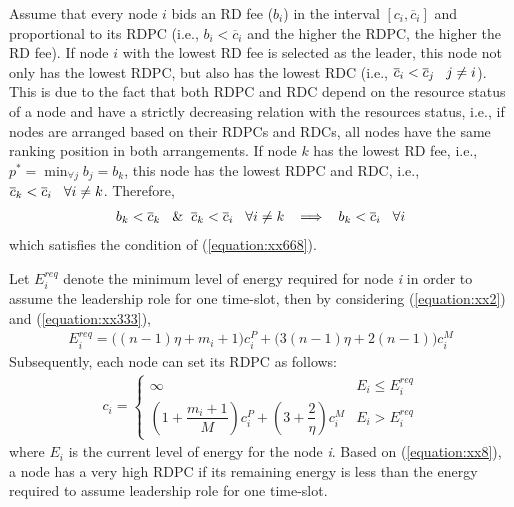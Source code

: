 \documentclass[journal,12pt, onecolumn]{IEEEtran}
\begin{document}
Assume that every node $i$ bids an RD fee ($b_i$) in the interval $[c_i,\overline{c}_i]$ and proportional to its RDPC (i.e., $b_i <\overline{c}_i$ and the higher the RDPC, the higher the RD fee). If node $i$ with the lowest RD fee is selected as the leader, this node not only has the lowest RDPC, but also has the lowest RDC (i.e., $\overline{c}_i<\overline{c}_j \hspace{3mm}  j\neq i$). This is due to the fact that both RDPC and RDC depend on the resource status of a node and have a strictly decreasing relation with the resources status, i.e., if nodes are arranged based on their RDPCs and RDCs, all nodes have the same ranking position in both arrangements. 
If node $k$ has the lowest RD fee, i.e., $p^* = \min_{\forall j} b_j = b_k$, this node has the lowest RDPC and RDC, i.e., $\overline{c}_k <\overline{c}_i \hspace{3mm} \forall i\neq k$. Therefore,
\begin{align}
\label{equation:xx601}
b_k <\overline{c}_k  \hspace{3mm} \&  \hspace{2mm} \overline{c}_k<\overline{c}_i \hspace{3mm} \forall i\neq k \hspace{3mm} \Longrightarrow \hspace{3mm} b_k <\overline{c}_i \hspace{3mm} \forall i
\end{align} 
which satisfies the condition of (\ref{equation:xx668}).




Let $E_i ^{req}$ denote the minimum level of energy required for node \textit{i} in order to assume the leadership role for one time-slot, then by considering (\ref{equation:xx2}) and (\ref{equation:xx333}),
\begin{align*}
E_i^{req} = \big((n-1)\eta + m_i +1\big) c_i ^{P} +  \big( 3(n-1)\eta+2(n-1) \big) c_i ^{M}  
\end{align*} 
Subsequently, each node can set its RDPC as follows: 
\begin{align}
\label{equation:xx8}
    c_i = \begin{cases}
               \infty   & E_i \le E_i^{req}\\
             (1 + \dfrac{m_i +1}{M})c_i ^{P} + (3+\dfrac{2}{\eta})c_i ^{M} & E_i > E_i^{req}
           \end{cases}
\end{align}
where $E_i$ is the current level of energy for the node \textit{i}. Based on (\ref{equation:xx8}), a node has a very high RDPC if its remaining energy is less than the energy required to assume leadership role for one time-slot.
\end{document}

